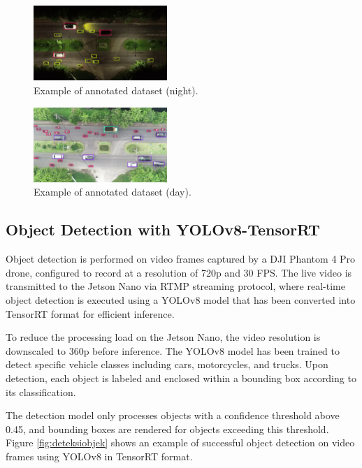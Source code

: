 \begin{figure}[H]
    \centering
    \includegraphics[width=0.45\textwidth]{gambar/anotasidatamalam.png}
    \caption{Example of annotated dataset (night).}
    \label{fig:annot-night}
\end{figure}

\begin{figure}[H]
    \centering
    \includegraphics[width=0.45\textwidth]{gambar/anotasidatasiang.png}
    \caption{Example of annotated dataset (day).}
    \label{fig:annot-day}
\end{figure}

\subsection{Object Detection with YOLOv8-TensorRT}

Object detection is performed on video frames captured by a DJI Phantom 4 Pro drone, configured to record at a resolution of 720p and 30 FPS. The live video is transmitted to the Jetson Nano via RTMP streaming protocol, where real-time object detection is executed using a YOLOv8 model that has been converted into TensorRT format for efficient inference.

To reduce the processing load on the Jetson Nano, the video resolution is downscaled to 360p before inference. The YOLOv8 model has been trained to detect specific vehicle classes including cars, motorcycles, and trucks. Upon detection, each object is labeled and enclosed within a bounding box according to its classification.

The detection model only processes objects with a confidence threshold above 0.45, and bounding boxes are rendered for objects exceeding this threshold. Figure \ref{fig:deteksiobjek} shows an example of successful object detection on video frames using YOLOv8 in TensorRT format.

